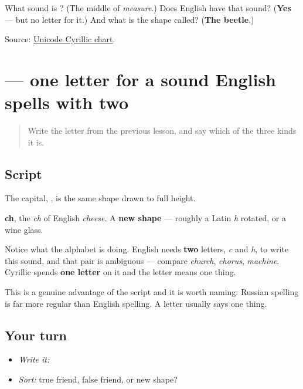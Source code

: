 \begin{tcolorbox}[breakable,colback=teal!4,colframe=teal!35!black,title={Before you move on}]
What sound is \textbf{}? (The middle of \emph{measure}.) Does English have that sound? (\textbf{Yes} — but no letter for it.) And what is the shape called? (\textbf{The beetle}.)

Source: \href{https://www.unicode.org/charts/PDF/U0400.pdf}{Unicode Cyrillic chart}.
\end{tcolorbox}
\section[\texorpdfstring{\ru{ч} (ch)}{ч (ch)}]{ — one letter for a sound English spells with two}

\label{lesson:RU-W06-ch}



\begin{quote}
Write the letter from the previous lesson, and say which of the three kinds it is.
\end{quote}

\subsection*{Script}

\begin{quote}
   
\end{quote}

The capital, \textbf{}, is the same shape drawn to full height.

\textbf{ch}, the \emph{ch} of English \emph{cheese}. A \textbf{new shape} — roughly a Latin \emph{h} rotated, or a wine glass.

Notice what the alphabet is doing. English needs \textbf{two} letters, \emph{c} and \emph{h}, to write this sound, and that pair is ambiguous — compare \emph{church}, \emph{chorus}, \emph{machine}. Cyrillic spends \textbf{one letter} on it and the letter means one thing.

This is a genuine advantage of the script and it is worth naming: Russian spelling is far more regular than English spelling. A letter usually says one thing.

\subsection*{Your turn}
\begin{itemize}
\raggedright
  \item \emph{Write it:} 
  \item \emph{Sort:} true friend, false friend, or new shape?
\end{itemize}

